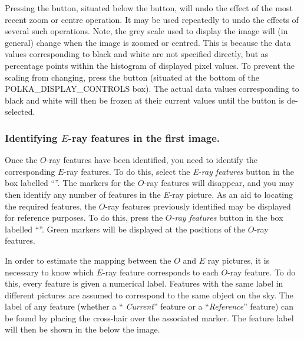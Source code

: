 Pressing the  button, situated below
the  button, will undo the effect of the
most recent zoom or centre operation. It may be used repeatedly to undo
the effects of several such operations. Note, the grey scale used to
display the image will (in general) change when the image is zoomed or
centred. This is because the data values corresponding to black and
white are not specified directly, but as percentage points within the
histogram of displayed pixel values. To prevent the scaling from
changing, press the 
button (situated at the bottom of the 
{POLKA_DISPLAY_CONTROLS} box). The actual data values corresponding to
black and white will then be frozen at their current values until the
button is de-selected.

\subsubsection {Identifying $E$-ray features in the first image.}
Once the $O$-ray features have been identified, you need to identify the
corresponding $E$-ray features. To do this, select the {\em E-ray
features} button in the box labelled ``''. The markers for the $O$-ray features will
disappear, and you may then identify any number of features in the
$E$-ray picture. As an aid to locating the required features, the $O$-ray
features previously identified may be displayed for reference purposes. To
do this, press the {\em $O$-ray features} button in the box labelled
``''. Green markers will be
displayed at the positions of the $O$-ray features.

In order to estimate the mapping between the $O$ and $E$ ray pictures, it
is necessary to know which $E$-ray feature corresponds to each $O$-ray
feature. To do this, every feature is given a numerical label. Features
with the same label in different pictures are assumed to correspond to
the same object on the sky. The label of any feature (whether a ``{\em
Current}'' feature or a ``{\em Reference}'' feature) can be found by
placing the cross-hair over the associated marker. The feature label
will then be shown in the  below 
the image.


